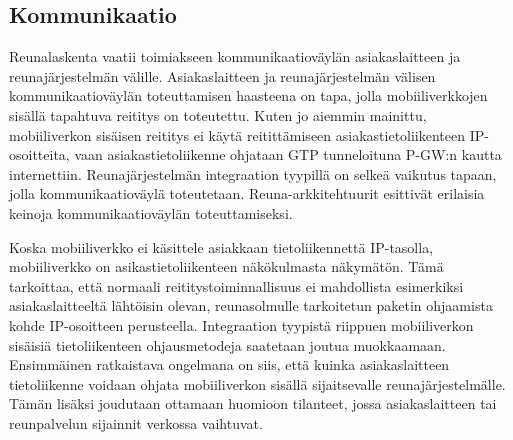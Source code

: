 \subsection{Kommunikaatio} \label{kommunikaatio}
Reunalaskenta vaatii toimiakseen kommunikaatioväylän asiakaslaitteen ja reunajärjestelmän välille. 
Asiakaslaitteen ja reunajärjestelmän välisen kommunikaatioväylän toteuttamisen haasteena on tapa, jolla mobiiliverkkojen sisällä tapahtuva reititys on toteutettu. 
Kuten jo aiemmin mainittu, mobiiliverkon sisäisen reititys ei käytä reitittämiseen asiakastietoliikenteen IP-osoitteita, vaan asiakastietoliikenne ohjataan GTP tunneloituna P-GW:n kautta internettiin. 
Reunajärjestelmän integraation tyypillä on selkeä vaikutus tapaan, jolla kommunikaatioväylä toteutetaan. Reuna-arkkitehtuurit esittivät erilaisia keinoja kommunikaatioväylän toteuttamiseksi.


%

Koska mobiiliverkko ei käsittele asiakkaan tietoliikennettä IP-tasolla, mobiiliverkko on asikastietoliikenteen näkökulmasta näkymätön.
Tämä tarkoittaa, että normaali reititystoiminnallisuus ei mahdollista esimerkiksi asiakaslaitteeltä lähtöisin olevan, reunasolmulle tarkoitetun paketin ohjaamista kohde IP-osoitteen perusteella. 
Integraation tyypistä riippuen mobiiliverkon sisäisiä tietoliikenteen ohjausmetodeja saatetaan joutua muokkaamaan.
Ensimmäinen ratkaistava ongelmana on siis, että kuinka asiakaslaitteen tietoliikenne voidaan ohjata mobiiliverkon sisällä sijaitsevalle reunajärjestelmälle.
Tämän lisäksi joudutaan ottamaan huomioon tilanteet, jossa asiakaslaitteen tai reunpalvelun sijainnit verkossa vaihtuvat.

